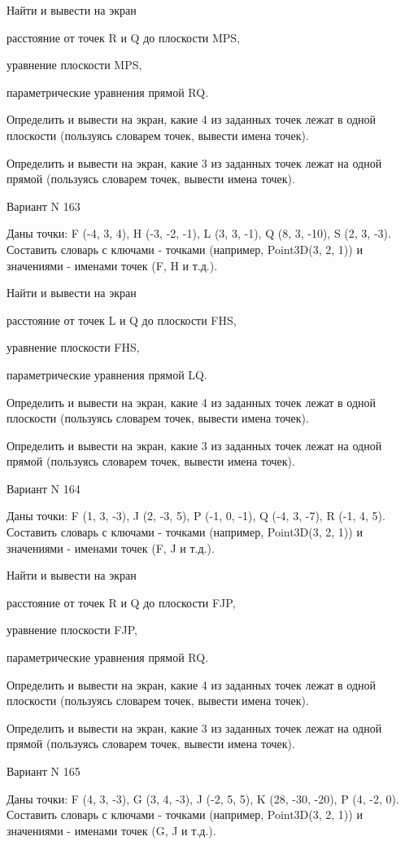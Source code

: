 \documentclass[11pt]{report}
\begin{document}
Найти и вывести на экран


расстояние от точек R и Q до плоскости MPS,


уравнение плоскости MPS,


параметрические уравнения прямой RQ.


Определить и вывести на экран, какие 4 из заданных точек лежат в одной плоскости (пользуясь словарем точек, вывести имена точек).


Определить и вывести на экран, какие 3 из заданных точек лежат на одной прямой (пользуясь словарем точек, вывести имена точек).

\newpage
Вариант N 163

Даны точки: F (-4, 3, 4), H (-3, -2, -1), L (3, 3, -1), Q (8, 3, -10), S (2, 3, -3).
Составить словарь с ключами - точками (например, Point3D(3, 2, 1)) и значениями - именами точек (F, H и т.д.).


Найти и вывести на экран


расстояние от точек L и Q до плоскости FHS,


уравнение плоскости FHS,


параметрические уравнения прямой LQ.


Определить и вывести на экран, какие 4 из заданных точек лежат в одной плоскости (пользуясь словарем точек, вывести имена точек).


Определить и вывести на экран, какие 3 из заданных точек лежат на одной прямой (пользуясь словарем точек, вывести имена точек).

\newpage
Вариант N 164

Даны точки: F (1, 3, -3), J (2, -3, 5), P (-1, 0, -1), Q (-4, 3, -7), R (-1, 4, 5).
Составить словарь с ключами - точками (например, Point3D(3, 2, 1)) и значениями - именами точек (F, J и т.д.).


Найти и вывести на экран


расстояние от точек R и Q до плоскости FJP,


уравнение плоскости FJP,


параметрические уравнения прямой RQ.


Определить и вывести на экран, какие 4 из заданных точек лежат в одной плоскости (пользуясь словарем точек, вывести имена точек).


Определить и вывести на экран, какие 3 из заданных точек лежат на одной прямой (пользуясь словарем точек, вывести имена точек).

\newpage
Вариант N 165

Даны точки: F (4, 3, -3), G (3, 4, -3), J (-2, 5, 5), K (28, -30, -20), P (4, -2, 0).
Составить словарь с ключами - точками (например, Point3D(3, 2, 1)) и значениями - именами точек (G, J и т.д.).
\end{document}

